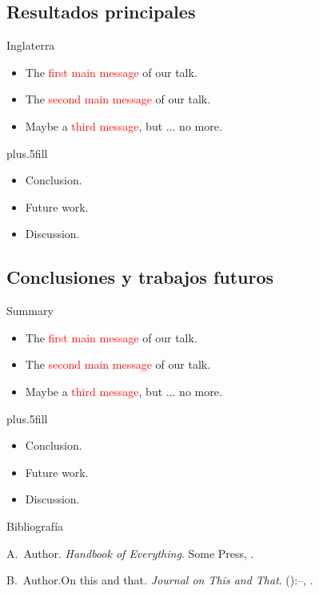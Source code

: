 \documentclass{beamer}
\begin{document}
%
\subsection{Resultados principales}

\begin{frame}{Inglaterra}
	\begin{itemize}
		\item The \textcolor{red}{first main message} of our talk.
		\item The \textcolor{red}{second main message} of our talk.
		\item Maybe a \textcolor{red}{third message}, but ... no more.
	\end{itemize}
	\vskip0pt plus.5fill
	\begin{itemize}
		\item Conclusion.
	\end{itemize}
	\begin{itemize}
		\item Future work.
		\item Discussion.
	\end{itemize}
\end{frame}

\subsection{Conclusiones y trabajos futuros}

\begin{frame}{Summary}
	\begin{itemize}
		\item The \textcolor{red}{first main message} of our talk.
		\item The \textcolor{red}{second main message} of our talk.
		\item Maybe a \textcolor{red}{third message}, but ... no more.
	\end{itemize}
	\vskip0pt plus.5fill
	\begin{itemize}
		\item Conclusion.
	\end{itemize}
	\begin{itemize}
		\item Future work.
		\item Discussion.
	\end{itemize}
\end{frame}

\begin{frame}{Bibliografía}
	\begin{thebibliography}{2}
		\beamertemplatebookbibitems
		A.\ Author. \newblock\emph{Handbook of Everything}.\newblock
\textlatin{Some Press, }.

		\beamertemplatearticlebibitems
		B.\ Author.\newblock On this and that\emph{.}
\newblock\emph{Journal on This and That}. 
():--, 
.
	\end{thebibliography}
\end{frame}
\end{document}

